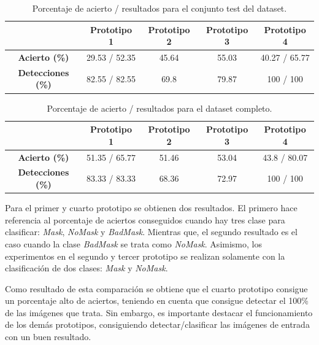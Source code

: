 \begin{table}[h!]
	\begin{center}
		\begin{tabular}{ |c|c|c|c|c| } 
			\hline
			& \textbf{Prototipo 1} & \textbf{Prototipo 2} & \textbf{Prototipo 3} & \textbf{Prototipo 4} \\
			\hline
			\textbf{Acierto (\%)} & 29.53 / 52.35 & 45.64 & 55.03 & 40.27 / 65.77 \\
			\hline
			\textbf{Detecciones (\%)} & 82.55 / 82.55 & 69.8  & 79.87 & 100 / 100 \\
			\hline
		\end{tabular}
		\caption{Porcentaje de acierto / resultados para el conjunto test del dataset.}
		\label{tab:test}
	\end{center}
\end{table}

\begin{table}[h!]
	\begin{center}
		\begin{tabular}{ |c|c|c|c|c| } 
			\hline
			& \textbf{Prototipo 1} & \textbf{Prototipo 2} & \textbf{Prototipo 3} & \textbf{Prototipo 4} \\
			\hline
			\textbf{Acierto (\%)} & 51.35 / 65.77 & 51.46 & 53.04 & 43.8 / 80.07 \\
			\hline
			\textbf{Detecciones (\%)} & 83.33 / 83.33 & 68.36  & 72.97 & 100 / 100 \\
			\hline
		\end{tabular}
		\caption{Porcentaje de acierto / resultados para el dataset completo.}
		\label{tab:dataset}
	\end{center}
\end{table}

Para el primer y cuarto prototipo se obtienen dos resultados. El primero hace referencia al porcentaje de aciertos conseguidos cuando hay tres clase para clasificar: \textit{Mask}, \textit{NoMask} y \textit{BadMask}. Mientras que, el segundo resultado es el caso cuando la clase \textit{BadMask} se trata como \textit{NoMask}. Asimismo, los experimentos en el segundo y tercer prototipo se realizan solamente con la clasificación de dos clases: \textit{Mask} y \textit{NoMask}. 

Como resultado de esta comparación se obtiene que el cuarto prototipo consigue un porcentaje alto de aciertos, teniendo en cuenta que consigue detectar el 100\% de las imágenes que trata. Sin embargo, es importante destacar el funcionamiento de los demás prototipos, consiguiendo detectar/clasificar las imágenes de entrada con un buen resultado.


